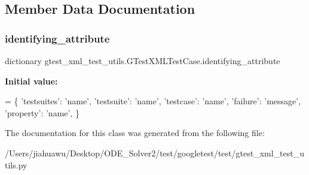 \subsection{Member Data Documentation}
\mbox{\label{classgtest__xml__test__utils_1_1_g_test_x_m_l_test_case_a0e3a4e84e18f29d2248dcd670a0a6ae6}} 
\subsubsection{\texorpdfstring{identifying\+\_\+attribute}{identifying\_attribute}}
{\footnotesize\ttfamily dictionary gtest\+\_\+xml\+\_\+test\+\_\+utils.\+G\+Test\+X\+M\+L\+Test\+Case.\+identifying\+\_\+attribute\hspace{0.3cm}{\ttfamily [static]}}

{\bfseries Initial value\+:}
\begin{DoxyCode}
=  \{
      \textcolor{stringliteral}{'testsuites'}: \textcolor{stringliteral}{'name'},
      \textcolor{stringliteral}{'testsuite'}: \textcolor{stringliteral}{'name'},
      \textcolor{stringliteral}{'testcase'}: \textcolor{stringliteral}{'name'},
      \textcolor{stringliteral}{'failure'}: \textcolor{stringliteral}{'message'},
      \textcolor{stringliteral}{'property'}: \textcolor{stringliteral}{'name'},
  \}
\end{DoxyCode}


The documentation for this class was generated from the following file\+:\begin{DoxyCompactItemize}
\item 
/\+Users/jiahuawu/\+Desktop/\+O\+D\+E\+\_\+\+Solver2/test/googletest/test/gtest\+\_\+xml\+\_\+test\+\_\+utils.\+py\end{DoxyCompactItemize}
